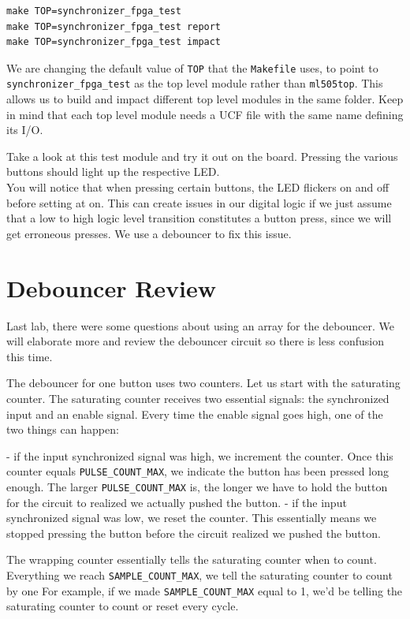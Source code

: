 \documentclass[11pt]{article}
\begin{document}
\begin{verbatim}
make TOP=synchronizer_fpga_test
make TOP=synchronizer_fpga_test report
make TOP=synchronizer_fpga_test impact
\end{verbatim} 

We are changing the default value of \verb|TOP| that the \verb|Makefile| uses, to point to \verb|synchronizer_fpga_test| as the top level module rather than \verb|ml505top|. This allows us to build and impact different top level modules in the same folder. Keep in mind that each top level module needs a UCF file with the same name defining its I/O.

Take a look at this test module and try it out on the board. Pressing the various buttons should light up the respective LED. \\

You will notice that when pressing certain buttons, the LED flickers on and off before setting at on. This can create issues in our digital logic if we just assume that a low to high logic level transition constitutes a button press, since we will get erroneous presses. We use a debouncer to fix this issue.

\section{Debouncer Review}
Last lab, there were some questions about using an array for the debouncer. We will elaborate more and review the debouncer circuit so there is less confusion this time. 

The debouncer for one button uses two counters. Let us start with the saturating counter. The saturating counter receives two essential signals: the synchronized input and an enable signal. Every time the enable signal goes high, one of the two things can happen:

- if the input synchronized signal was high, we increment the counter. Once this counter equals \verb|PULSE_COUNT_MAX|, we indicate the button has been pressed long enough. The larger \verb|PULSE_COUNT_MAX| is, the longer we have to hold the button for the circuit to realized we actually pushed the button.
- if the input synchronized signal was low, we reset the counter. This essentially means we stopped pressing the button before the circuit realized we pushed the button.

The wrapping counter essentially tells the saturating counter when to count. Everything we reach \verb|SAMPLE_COUNT_MAX|, we tell the saturating counter to count by one For example, if we made \verb|SAMPLE_COUNT_MAX| equal to 1, we'd be telling the saturating counter to count or reset every cycle. 
\end{document}
